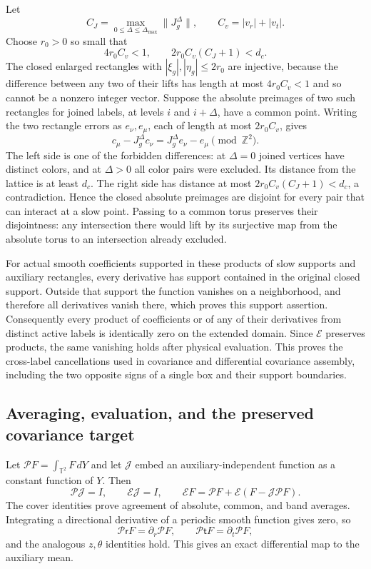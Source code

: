 \documentclass[10pt,a4paper]{article}
\begin{document}
Let
\[
 C_J=\max_{0\le\Delta\le\Delta_{\max}}\|J_g^\Delta\|,
 \qquad C_v=|v_r|+|v_t|.
\]
Choose $r_0>0$ so small that
\[
 4r_0C_v<1,\qquad 2r_0C_v(C_J+1)<d_c.
\]
The closed enlarged rectangles with
$|\xi_g|,|\eta_g|\le2r_0$ are injective, because the difference
between any two of their lifts has length at most $4r_0C_v<1$ and
so cannot be a nonzero integer vector.  Suppose the absolute
preimages of two such rectangles for joined labels, at levels
$i$ and $i+\Delta$, have a common point.  Writing the two rectangle
errors as $e_\nu,e_\mu$, each of length at most $2r_0C_v$, gives
\[
 c_\mu-J_g^\Delta c_\nu
   =J_g^\Delta e_\nu-e_\mu\pmod{\mathbb Z^2}.
\]
The left side is one of the forbidden differences: at $\Delta=0$
joined vertices have distinct colors, and at $\Delta>0$ all color
pairs were excluded.  Its distance from the lattice is at least
$d_c$.  The right side has distance at most
$2r_0C_v(C_J+1)<d_c$, a contradiction.  Hence the closed absolute
preimages are disjoint for every pair that can interact at a slow
point.  Passing to a common torus preserves their disjointness: any
intersection there would lift by its surjective map from the absolute
torus to an intersection already excluded.

For actual smooth coefficients supported in these products of slow
supports and auxiliary rectangles, every derivative has support
contained in the original closed support.  Outside that support the
function vanishes on a neighborhood, and therefore all derivatives
vanish there, which proves this support assertion.  Consequently every
product of coefficients or of any of their derivatives from distinct
active labels is identically zero on the extended domain.  Since
$\mathcal E$ preserves products, the same vanishing holds after
physical evaluation.  This proves the cross-label cancellations used
in covariance and differential covariance assembly, including the
two opposite signs of a single box and their support boundaries.

\subsection{Averaging, evaluation, and the preserved covariance target}
Let $\mathcal P F=\int_{\mathbb T^2}F\,dY$ and let
$\mathcal J$ embed an auxiliary-independent function as a constant
function of $Y$.  Then
\[
 \mathcal P\mathcal J=I,\qquad\mathcal E\mathcal J=I,
 \qquad \mathcal E F=\mathcal P F+
                  \mathcal E(F-\mathcal J\mathcal P F).
\]
The cover identities prove agreement of absolute, common, and band
averages.  Integrating a directional derivative of a periodic smooth
function gives zero, so
\[
 \mathcal P\mathsf r F=\partial_r\mathcal PF,\qquad
 \mathcal P\mathsf t F=\partial_t\mathcal PF,
\]
and the analogous $z,\theta$ identities hold.  This gives an exact
differential map to the auxiliary mean.
\end{document}
